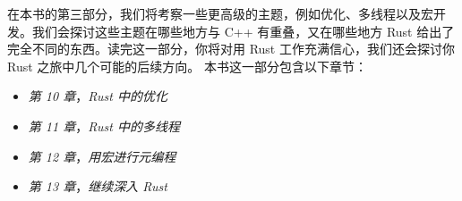 在本书的第三部分，我们将考察一些更高级的主题，例如优化、多线程以及宏开发。我们会探讨这些主题在哪些地方与 C++ 有重叠，又在哪些地方 Rust 给出了完全不同的东西。读完这一部分，你将对用 Rust 工作充满信心，我们还会探讨你 Rust 之旅中几个可能的后续方向。
本书这一部分包含以下章节：
\begin{itemize}
  \item \emph{第 10 章}，\emph{Rust 中的优化}
  \item \emph{第 11 章}，\emph{Rust 中的多线程}
  \item \emph{第 12 章}，\emph{用宏进行元编程}
  \item \emph{第 13 章}，\emph{继续深入 Rust}
\end{itemize}  
